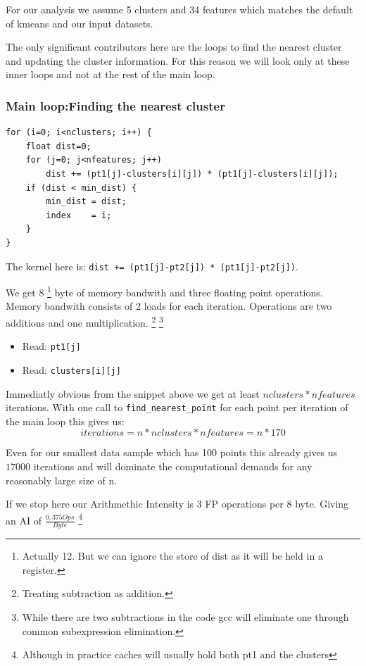 \documentclass[]{article}
\begin{document}
For our analysis we assume 5 clusters and 34 features which matches
the default of kmeans and our input datasets.

The only significant contributors here are the loops to find the nearest cluster and updating the cluster information.
For this reason we will look only at these inner loops and not at the rest of the main loop.


\subsubsection{Main loop:Finding the nearest cluster}
\begin{lstlisting}[caption={Inlined representation of find\_nearest\_point}]
for (i=0; i<nclusters; i++) {
	float dist=0;
	for (j=0; j<nfeatures; j++)
		dist += (pt1[j]-clusters[i][j]) * (pt1[j]-clusters[i][j]);
	if (dist < min_dist) {
		min_dist = dist;
		index    = i;
	}
}
\end{lstlisting}
The kernel here is: \texttt{dist += (pt1[j]-pt2[j]) * (pt1[j]-pt2[j])}.\newline

We get 8
\footnote{Actually 12. But we can ignore the store of dist as it will be held in a register.}
byte of memory bandwith and three floating point operations.
Memory bandwith consists of 2 loads for each iteration.
Operations are two additions and one multiplication.
\footnote{Treating subtraction as addition.}
\footnote{While there are two subtractions in the code gcc will eliminate one through common subexpression elimination.}
\begin{itemize}[noitemsep,nolistsep]
	\item Read: \texttt{pt1[j]}
	\item Read: \texttt{clusters[i][j]}
\end{itemize}

Immediatly obvious from the snippet above we get at least $nclusters * nfeatures$ iterations.
With one call to \texttt{find\_nearest\_point} for each point per iteration of the main loop this gives us:\\
$$iterations = n * nclusters * nfeatures = n * 170$$

Even for our smallest data sample which has 100 points this already gives us $17000$ iterations and will dominate the computational demands for any reasonably large size of n.

If we stop here our Arithmethic Intensity is 3 FP operations per 8 byte. Giving an AI of $\frac{0,375 Ops}{Byte}$
\footnote{Although in practice caches will usually hold both pt1 and the clusters}
\end{document}
